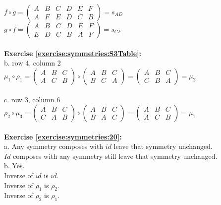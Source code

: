 $f\circ g=\begin{pmatrix}
A & B & C & D & E & F\\
A & F & E & D & C & B
\end{pmatrix}=s_{AD}$\\
$g\circ f=\begin{pmatrix}
A & B & C & D & E & F\\
E & D & C & B & A & F
\end{pmatrix}=s_{CF}$\\
\\
\textbf{Exercise \ref{exercise:symmetries:S3Table}:}\\
b. row 4, column 2\\
$\mu_1\circ \rho_1=\begin{pmatrix}
A & B & C\\
A & C & B
\end{pmatrix}\circ \begin{pmatrix}
A & B & C\\
B & C & A
\end{pmatrix}=\begin{pmatrix}
A & B & C\\
C & B & A
\end{pmatrix}=\mu_2$\\
\\
c. row 3, column 6\\
$\rho_2\circ \mu_3=\begin{pmatrix}
A & B & C\\
C & A & B
\end{pmatrix}\circ \begin{pmatrix}
A & B & C\\
B & A & C
\end{pmatrix}=\begin{pmatrix}
A & B & C\\
A & C & B
\end{pmatrix}=\mu_1$\\
\\
\textbf{Exercise \ref{exercise:symmetries:20}:}\\
a. Any symmetry composes with $id$ leave that symmetry unchanged.\\
$Id$ composes with any symmetry still leave that symmetry unchanged.\\
b. Yes.\\
Inverse of $id$ is $id$.\\
Inverse of $\rho_1$ is $\rho_2$.\\
Inverse of $\rho_2$ is $\rho_1$.\\
